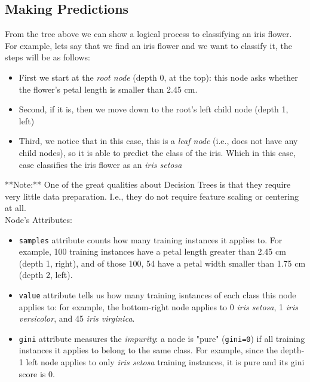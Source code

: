 \subsection{Making Predictions}

From the tree above we can show a logical process to classifying an iris flower. \\

\noindent
For example, lets say that we find an iris flower and we want to classify it, the steps will be as follows:

\begin{itemize}
    \item First we start at the \textit{root node} (depth 0, at the top): this node asks whether the flower's petal length is smaller than 
    2.45 cm.
    \item Second, if it is, then we move down to the root's left child node (depth 1, left)
    \item Third, we notice that in this case, this is a \textit{leaf node} (i.e., does not have any child nodes), so it is able to predict 
    the class of the iris. Which in this case, case classifies the iris flower as an \textit{iris setosa}
\end{itemize}

\noindent
**Note:** One of the great qualities about Decision Trees is that they require very little data preparation. I.e., they do not require 
feature scaling or centering at all. \\

\noindent
Node's Attributes:

\begin{itemize}
    \item \texttt{samples} attribute counts how many training instances it applies to. For example, 100 training instances
    have a petal length greater than 2.45 cm (depth 1, right), and of those 100, 54 have a petal width smaller than 1.75 cm 
    (depth 2, left). 
    \item \texttt{value} attribute tells us how many training isntances of each class this node applies to: for example, 
    the bottom-right node applies to 0 \textit{iris setosa}, 1 \textit{iris versicolor}, and 45 \textit{iris virginica}.
    \item \texttt{gini} attribute measures the \textit{impurity}: a node is "pure" (\texttt{gini=0}) if all 
    training instances it applies to belong to the same class. For example, since the depth-1 left node applies to only 
    \textit{iris setosa} training instances, it is pure and its gini score is 0. 
\end{itemize}

